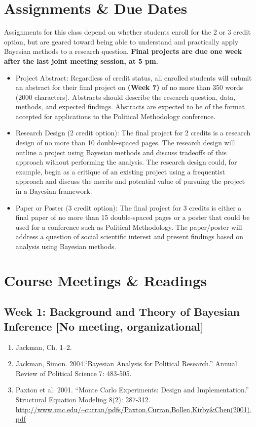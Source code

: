 \documentclass[11pt, leqno, fleqn]{article}
\begin{document}
\section*{Assignments \& Due Dates}
\noindent Assignments for this class depend on whether students enroll for the 2 or 3 credit option, but are geared toward being able to understand and practically apply Bayesian methods to a research question. {\bf Final projects are due one week after the last joint meeting session, at 5 pm.}
\begin{itemize}
\item Project Abstract: Regardless of credit status, all enrolled students will submit an abstract for their final project on {\bf (Week 7)} of no more than 350 words (2000 characters). Abstracts should describe the research question, data, methods, and expected findings. Abstracts are expected to be of the format accepted for applications to the Political Methodology conference.
\item Research Design (2 credit option): The final project for 2 credits is a research design of no more than 10 double-spaced pages. The research design will outline a project using Bayesian methods and discuss tradeoffs of this approach without performing the analysis. The research design could, for example, begin as a critique of an existing project using a frequentist approach and discuss the merits and potential value of pursuing the project in a Bayesian framework.
\item Paper or Poster (3 credit option): The final project for 3 credits is either a final paper of no more than 15 double-spaced pages or a poster that could be used for a conference such as Political Methodology. The paper/poster will address a question of social scientific interest and present findings based on analysis using Bayesian methods.
\end{itemize}

\section*{Course Meetings \& Readings}
\subsection*{Week 1: Background and Theory of Bayesian Inference [No meeting, organizational]}
	\begin{enumerate}
	\item[] Jackman, Ch. 1--2.
	\item[] Jackman, Simon. 2004.``Bayesian Analysis for Political
Research.'' Annual Review of Political Science 7: 483-505.
	\item[] Paxton et al. 2001. ``Monte Carlo Experiments: Design and Implementation.'' Structural Equation Modeling 8(2): 287-312. \url{http://www.unc.edu/~curran/pdfs/Paxton,Curran,Bollen,Kirby&Chen(2001).pdf}
	\end{enumerate}
\end{document}
